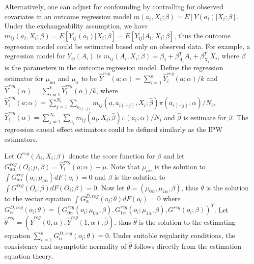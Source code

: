 \documentclass[oupdraft]{bio}
\begin{document}
Alternatively, one can adjust for confounding by controlling for observed covariates in an outcome regression model $m(a_i,X_i;\beta)=E[Y(a_i)|X_i;\beta]$. Under the exchangeability assumption, we have $ m_{ij}(a_i,X_i;\beta)=E[Y_{ij}(a_i)|X_i;\beta]=E[Y_{ij}|A_i,X_i;\beta]$, thus the outcome regression model could be estimated based only on observed data. For example, a regression model for $Y_{ij}(A_i)$ is $m_{ij}(A_i,X_i;\beta)=\beta_1+\beta_{A_i}^{T}A_i+\beta_{X_i}^{T}X_i$, where $\beta$ is the parameters in the outcome regression model. Define the regression estimator for $\mu_{a\alpha}$ and $\mu_{\alpha}$ to be  $\widehat{Y}^{reg}(a;\alpha)=\sum_{i=1}^k\widehat{Y}_i^{reg}(a;\alpha)/k$ and $\widehat{Y}^{reg}(\alpha)=\sum_{i=1}^k\widehat{Y}_i^{reg}(\alpha)/k$, where $\widehat{Y}_i^{reg}(a;\alpha)=\sum_{j=1}^{N_i}\sum_{a_{i(-j)}}m_{ij}(a,a_{i(-j)},X_i;\hat\beta)\pi(a_{i(-j)};\alpha)/N_i$, $\widehat{Y}^{reg}_i(\alpha)=\sum_{j=1}^{N_i}\sum_{a_i}m_{ij}(a_i,X_i;\hat\beta)\pi(a_i;\alpha)/N_i$ and $\hat{\beta}$ is estimate for $\beta$. The regression causal effect estimators could be defined similarly as the IPW estimators.


Let $G^{reg}(A_i,X_i;\beta)$ denote the score function for $\beta$ and let $G^{reg}_{a\alpha}(O_i;\mu,\beta) =\widehat{Y}_i^{reg}(a;\alpha)- \mu$. Note that $\mu_{a\alpha}$ is the solution to $\int G^{reg}_{a\alpha}(o_i;\mu_{a\alpha}) dF(o_i) = 0$ and $\beta$ is the solution to $\int G^{reg}(O_i;\beta)dF(O_i;\beta)=0$. Now let $\theta=(\mu_{0\alpha},\mu_{1\alpha},\beta)$, thus $\theta$ is the solution to the vector equation $\int G^{ D, reg}_{\alpha}(o_i;\theta) dF(o_i) = 0$ where $G^{ D,reg}_{\alpha}(o_i;\theta)=(G^{reg}_{0\alpha}(o_i;\mu_{0\alpha},\beta),G^{reg}_{1\alpha}(o_i;\mu_{1\alpha},\beta),G^{reg}(o_i;\beta))^T$. Let $\hat\theta^{reg}=(\hat Y^{reg}(0,\alpha),\hat Y^{reg}(1,\alpha),\hat\beta)$, thus $\hat \theta$ is the solution to the estimating equation $\sum_{v=1}^k G^{D,reg}_{\alpha}(o_i;\theta)=0$. Under suitable regularity conditions, the consistency and asymptotic normality of $\hat\theta$ follows directly from the estimation equation theory. 

\end{document}
